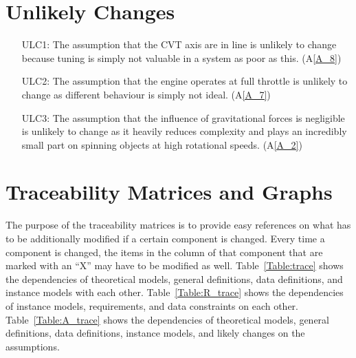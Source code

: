 \documentclass[12pt]{article}
\begin{document}
\section{Unlikely Changes}    

\begin{itemize}

  \item[ULC1:] The assumption that the CVT axis are in line is unlikely to change because tuning is simply not valuable in a system as poor as this. (A\ref{A_8})
  \item[ULC2:] The assumption that the engine operates at full throttle is unlikely to change as different behaviour is simply not ideal. (A\ref{A_7})
  \item[ULC3:] The assumption that the influence of gravitational forces is negligible is unlikely to change as it heavily reduces complexity and plays an incredibly small part on spinning objects at high rotational speeds. (A\ref{A_2})
  
  \end{itemize}
\section{Traceability Matrices and Graphs}

The purpose of the traceability matrices is to provide easy references on what
has to be additionally modified if a certain component is changed.  Every time a
component is changed, the items in the column of that component that are marked
with an ``X'' may have to be modified as well.  Table~\ref{Table:trace} shows the
dependencies of theoretical models, general definitions, data definitions, and
instance models with each other. Table~\ref{Table:R_trace} shows the
dependencies of instance models, requirements, and data constraints on each
other. Table~\ref{Table:A_trace} shows the dependencies of theoretical models,
general definitions, data definitions, instance models, and likely changes on
the assumptions.



\end{document}
